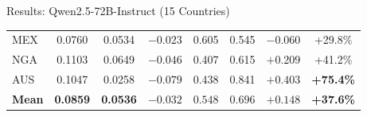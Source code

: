 \documentclass[11pt, aspectratio=169]{beamer}
\begin{document}
\begin{frame}{Results: Qwen2.5-72B-Instruct (15 Countries)}
\begin{table}
\begin{tabular}{@{}l cc c cc c c@{}}
MEX & 0.0760 & 0.0534 & $-0.023$ & 0.605 & 0.545 & $-0.060$ & \textcolor{cbGreen}{+29.8\%} \\
NGA & 0.1103 & 0.0649 & $-0.046$ & 0.407 & 0.615 & $+0.209$ & \textcolor{cbGreen}{+41.2\%} \\
\rowcolor{lightgray}
AUS & 0.1047 & 0.0258 & $-0.079$ & 0.438 & 0.841 & $+0.403$ & \textcolor{cbGreen}{\textbf{+75.4\%}} \\
\midrule
\textbf{Mean} & \textbf{0.0859} & \textbf{0.0536} & $\mathbf{-0.032}$ & $\mathbf{0.548}$ & $\mathbf{0.696}$ & $\mathbf{+0.148}$ & \textcolor{cbGreen}{\textbf{+37.6\%}} \\
\bottomrule
\end{tabular}
\end{table}

\end{frame}



\end{document}
